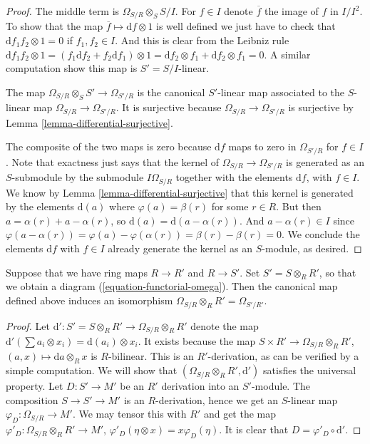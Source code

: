 \begin{proof}
The middle term is $\Omega_{S/R} \otimes_S S/I$.
For $f \in I$ denote $\overline{f}$ the image of $f$ in $I/I^2$.
To show that the map $\overline{f} \mapsto \text{d}f \otimes 1$
is well defined we just have to check that
$\text{d} f_1f_2 \otimes 1 = 0$ if $f_1, f_2 \in I$. 
And this is clear from the Leibniz rule 
$\text{d} f_1f_2 \otimes 1
=
(f_1 \text{d}f_2 + f_2 \text{d} f_1 )\otimes 1
=
\text{d}f_2 \otimes f_1 + \text{d}f_2 \otimes f_1
=
0$. A similar computation show this map is $S' = S/I$-linear.

\medskip\noindent
The map $\Omega_{S/R}\otimes_S S' \to \Omega_{S'/R}$
is the canonical $S'$-linear map associated to the
$S$-linear map $\Omega_{S/R} \to \Omega_{S'/R}$.
It is surjective because $\Omega_{S/R} \to \Omega_{S'/R}$
is surjective by Lemma \ref{lemma-differential-surjective}.

\medskip\noindent
The composite of the two maps is zero because
$\text{d}f$ maps to zero in $\Omega_{S'/R}$
for $f \in I$. Note that exactness just says that
the kernel of $\Omega_{S/R} \to \Omega_{S'/R}$
is generated as an $S$-submodule by the submodule $I\Omega_{S/R}$ together
with the elements $\text{d}f$, with $f \in I$. We know by
Lemma \ref{lemma-differential-surjective}
that this kernel is generated by the elements $\text{d}(a)$
where $\varphi(a) = \beta(r)$ for some $r \in R$.
But then $a = \alpha(r) + a - \alpha(r)$, so
$\text{d}(a) = \text{d}(a - \alpha(r))$. And
$a - \alpha(r) \in I$ since $\varphi(a - \alpha(r)) = 
\varphi(a) - \varphi(\alpha(r)) = \beta(r) - \beta(r) = 0$.
We conclude the elements $\text{d}f$ with $f \in I$ already
generate the kernel as an $S$-module, as desired.
\end{proof}

\begin{lemma}
\label{lemma-differentials-base-change}
Suppose that we have ring maps $R \to R'$ and $R \to S'$.
Set $S' = S\otimes_R R'$, so that we obtain a diagram
(\ref{equation-functorial-omega}). Then the canonical map defined above
induces an isomorphism $\Omega_{S/R} \otimes_R R' = \Omega_{S'/R'}$.
\end{lemma}

\begin{proof}
Let $\text{d}' : S' = S\otimes_R R' \to \Omega_{S/R} \otimes_R R'$ denote the
map $\text{d}'( \sum a_i \otimes x_i ) = \text{d}(a_i) \otimes x_i$.
It exists because the map $S \times R' \to \Omega_{S/R} \otimes_R R'$,
$(a,x)\mapsto \text{d}a\otimes_R x$ is $R$-bilinear.
This is an $R'$-derivation, as can be verified by a simple computation.
We will show that $(\Omega_{S/R} \otimes_R R', \text{d}')$ satisfies
the universal property. Let $D : S' \to M'$ be an $R'$ derivation
into an $S'$-module. The composition $S \to S' \to M'$ is an $R$-derivation,
hence we get an $S$-linear map $\varphi_D : \Omega_{S/R} \to M'$. We may
tensor this with $R'$ and get the map $\varphi'_D : 
\Omega_{S/R} \otimes_R R' \to M'$, $\varphi'_D(\eta \otimes x) =
x\varphi_D(\eta)$. It is clear that $D = \varphi'_D \circ \text{d}'$.
\end{proof}

